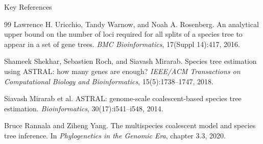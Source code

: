 \documentclass[11pt,aspectratio=169]{beamer}
\begin{document}
\begin{frame}{Key References}
\footnotesize
\begin{thebibliography}{99}
Lawrence H. Uricchio, Tandy Warnow, and Noah A. Rosenberg.
\newblock An analytical upper bound on the number of loci required for all splits of a species tree to appear in a set of gene trees.
\newblock \emph{BMC Bioinformatics}, 17(Suppl 14):417, 2016.

Shameek Shekhar, Sebastien Roch, and Siavash Mirarab.
\newblock Species tree estimation using ASTRAL: how many genes are enough?
\newblock \emph{IEEE/ACM Transactions on Computational Biology and Bioinformatics}, 15(5):1738--1747, 2018.

Siavash Mirarab et al.
\newblock ASTRAL: genome-scale coalescent-based species tree estimation.
\newblock \emph{Bioinformatics}, 30(17):i541--i548, 2014.

Bruce Rannala and Ziheng Yang.
\newblock The multispecies coalescent model and species tree inference.
\newblock In \emph{Phylogenetics in the Genomic Era}, chapter 3.3, 2020.
\end{thebibliography}



\end{frame}
\end{document}
